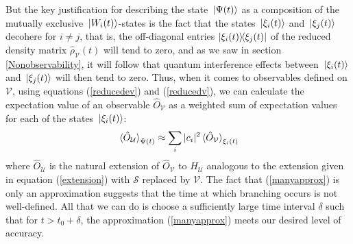     But the key justification for describing the state $\ket*{\Psi(t)}$ as a composition of the mutually exclusive $\ket*{W_i(t)}$-states is the fact that the states $\ket*{\xi_i(t)}$ and $\ket*{\xi_j(t)}$ decohere for $i\neq j$, that is, the off-diagonal entries $\dyad{\xi_i(t)}{\xi_j(t)}$ of the reduced density matrix $\hat{\rho}_\mathcal{V}(t)$ will tend to zero, and as we saw in section \ref{Nonobservability}, it will follow that quantum interference effects between $\ket*{\xi_i(t)}$ and $\ket*{\xi_j(t)}$ will then tend to zero. Thus, when it comes to observables defined on $\mathcal{V}$, using equations (\ref{reducedev}) and (\ref{reducedv}), we can calculate the expectation value of an observable $\hat{O}_\mathcal{V}$  as a weighted sum of expectation values for each of the states $\ket*{\xi_i(t)}$:
    \begin{equation}\label{manyapprox}\ev*{\hat{O}_\mathcal{U}}_{\Psi(t)}\approx\sum_i |c_i|^2 \ev*{\hat{O}_\mathcal{V}}_{\xi_i(t)}\end{equation}
    where $\hat{O}_\mathcal{U}$ is the natural extension of $\hat{O}_\mathcal{V}$ to $H_\mathcal{U}$ analogous to the extension given in equation (\ref{extension}) with $\mathcal{S}$ replaced by $\mathcal{V}$. 
    The fact that (\ref{manyapprox}) is only an approximation suggests that the time at which branching occurs is not well-defined. All that we can do is choose a  sufficiently large time interval $\delta$ such that for  $t>t_0+\delta$, the approximation (\ref{manyapprox}) meets our desired level of accuracy. 
    

